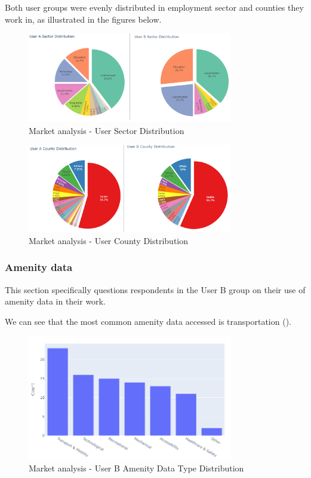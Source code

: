 Both user groups were evenly distributed in employment sector and counties they work in, as illustrated in the figures below.
\begin{figure}[h!]
    \centering
    \includegraphics[width=0.8\textwidth]{images/mr-sector-distribution.png}
    \caption{Market analysis - User Sector Distribution}
\end{figure}
\begin{figure}[h!]
    \centering
    \includegraphics[width=0.8\textwidth]{images/mr-county-distribution.png}
    \caption{Market analysis - User County Distribution}
\end{figure}

\subsubsection{Amenity data}
This section specifically questions respondents in the User B group on their use of amenity data in their work.

We can see that the most common amenity data accessed is transportation ().
\begin{figure}[h!]
    \centering
    \includegraphics[width=0.8\textwidth]{images/mr-userb-amenity.png}
    \caption{Market analysis - User B Amenity Data Type Distribution}
\end{figure}

